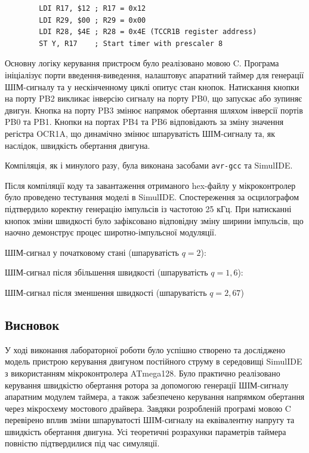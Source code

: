 \documentclass[14pt, a4paper]{extreport}
\begin{document}
	\begin{verbatim}
		LDI R17, $12 ; R17 = 0x12
		LDI R29, $00 ; R29 = 0x00
		LDI R28, $4E ; R28 = 0x4E (TCCR1B register address)
		ST Y, R17    ; Start timer with prescaler 8
	\end{verbatim}
	
	Основну логіку керування пристроєм було реалізовано мовою C. Програма ініціалізує порти введення-виведення, налаштовує апаратний таймер для генерації ШІМ-сигналу та у нескінченному циклі опитує стан кнопок. Натискання кнопки на порту PB2 викликає інверсію сигналу на порту PB0, що запускає або зупиняє двигун. Кнопка на порту PB3 змінює напрямок обертання шляхом інверсії портів PB0 та PB1. Кнопки на портах PB4 та PB6 відповідають за зміну значення регістра OCR1A, що динамічно змінює шпаруватість ШІМ-сигналу та, як наслідок, швидкість обертання двигуна.
	
	\pagebreak
	
	Компіляція, як і минулого разу, була виконана засобами \texttt{avr-gcc} та SimulIDE.
	
	
	Після компіляції коду та завантаження отриманого hex-файлу у мікроконтролер було проведено тестування моделі в SimulIDE. Спостереження за осцилографом підтвердило коректну генерацію імпульсів із частотою 25 кГц. При натисканні кнопок зміни швидкості було зафіксовано відповідну зміну ширини імпульсів, що наочно демонструє процес широтно-імпульсної модуляції.
	
	ШІМ-сигнал у початковому стані (шпаруватість $q = 2$):
	
	
	ШІМ-сигнал після збільшення швидкості (шпаруватість $q = 1,6$):
	
	
	ШІМ-сигнал після зменшення швидкості (шпаруватість $q = 2,67$)
	
	
	\subsection*{Висновок}
	
	У ході виконання лабораторної роботи було успішно створено та досліджено модель пристрою керування двигуном постійного струму в середовищі SimulIDE з використанням мікроконтролера ATmega128. Було практично реалізовано керування швидкістю обертання ротора за допомогою генерації ШІМ-сигналу апаратним модулем таймера, а також забезпечено керування напрямком обертання через мікросхему мостового драйвера. Завдяки розробленій програмі мовою C перевірено вплив зміни шпаруватості ШІМ-сигналу на еквівалентну напругу та швидкість обертання двигуна. Усі теоретичні розрахунки параметрів таймера повністю підтвердилися під час симуляції.
	
\end{document}
